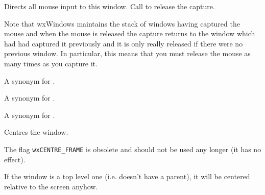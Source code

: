 Directs all mouse input to this window. Call  to
release the capture.

Note that wxWindows maintains the stack of windows having captured the mouse
and when the mouse is released the capture returns to the window which had had
captured it previously and it is only really released if there were no previous
window. In particular, this means that you must release the mouse as many times
as you capture it.



\label{wxwindowcenter}


A synonym for .

\label{wxwindowcenteronparent}


A synonym for .

\label{wxwindowcenteronscreen}


A synonym for .

\label{wxwindowcentre}


Centres the window.



The flag {\tt wxCENTRE\_FRAME} is obsolete and should not be used any longer
(it has no effect).


If the window is a top level one (i.e. doesn't have a parent), it will be
centered relative to the screen anyhow.


